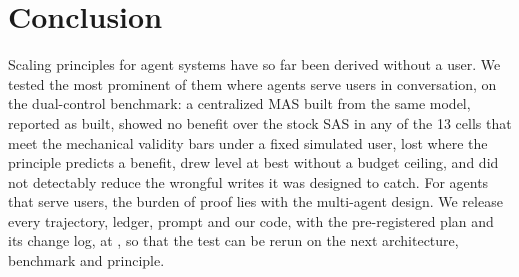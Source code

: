 \section{Conclusion}
\label{sec:conclusion}

Scaling principles for agent systems have so far been derived without a user. We tested the most prominent of them where agents serve users in conversation, on the dual-control benchmark: a centralized MAS built from the same model, reported as built, showed no benefit over the stock SAS in any of the 13 cells that meet the mechanical validity bars under a fixed simulated user, lost where the principle predicts a benefit, drew level at best without a budget ceiling, and did not detectably reduce the wrongful writes it was designed to catch. For agents that serve users, the burden of proof lies with the multi-agent design. We release every trajectory, ledger, prompt and our code, with the pre-registered plan and its change log, at , so that the test can be rerun on the next architecture, benchmark and principle.
